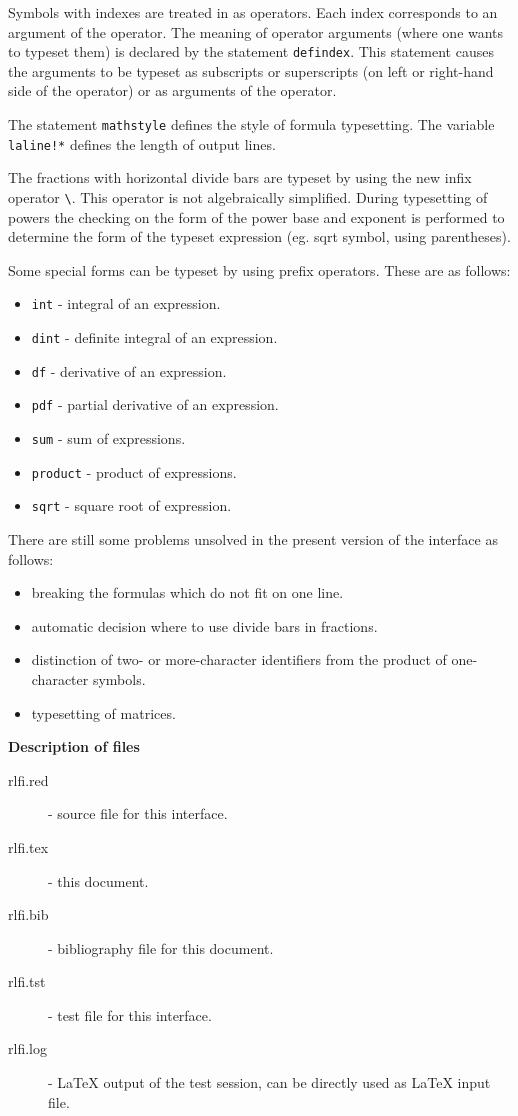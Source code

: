 Symbols with indexes are treated in \REDUCE{} as operators.  Each index
corresponds to an argument of the operator.  The meaning of operator
arguments (where one wants to typeset them) is declared by the statement
{\tt defindex}.  This statement causes the arguments to be typeset as
subscripts or superscripts (on left or right-hand side of the operator)
or as arguments of the operator.

The statement {\tt mathstyle} defines the style of formula typesetting.
The variable {\tt laline!*} defines the length of output lines.

The fractions with horizontal divide bars are typeset by using the
new \REDUCE{} infix operator \verb+\+.  This operator is not
algebraically simplified.  During typesetting of powers the checking on
the form of the power base and exponent is performed to determine the
form of the typeset expression (eg.  sqrt symbol, using parentheses).

Some special forms can be typeset by using \REDUCE{} prefix operators.
These are as follows:
\begin{itemize}
\item {\tt int} - integral of an expression.
\item {\tt dint} - definite integral of an expression.
\item {\tt df} - derivative of an expression.
\item {\tt pdf} - partial derivative of an expression.
\item {\tt sum} - sum of expressions.
\item {\tt product} - product of expressions.
\item {\tt sqrt} - square root of expression.
\end{itemize}
There are still some problems unsolved in the present version of the
interface as follows:
\begin{itemize}
\item breaking the formulas which do not fit on one line.
\item automatic decision where to use divide bars in fractions.
\item distinction of two- or more-character identifiers from the product
  of one-character symbols.
\item typesetting of matrices.
\end{itemize}

\vskip0.5cm

\centerline{\bf Description of files}

\begin{description}
\item[rlfi.red] - \REDUCE{} source file for this interface.
\item[rlfi.tex] - this document.
\item[rlfi.bib] - bibliography file for this document.
\item[rlfi.tst] - test file for this interface.
\item[rlfi.log] - \LaTeX{} output of the test session,
                   can be directly used as \LaTeX{} input file.
\end{description}


